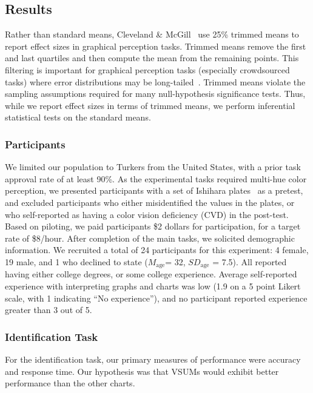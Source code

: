 \documentclass{vgtc}                          %
\begin{document}
\subsection{Results}

Rather than standard means, Cleveland \& McGill~\cite{cleveland1984graphical} use 25\% trimmed means to report effect sizes in graphical perception tasks. Trimmed means remove the first and last quartiles and then compute the mean from the remaining points. This filtering is important for graphical perception tasks (especially crowdsourced tasks) where error distributions may be long-tailed~\cite{heer2010crowdsourcing}. Trimmed means violate the sampling assumptions required for many null-hypothesis significance tests. Thus, while we report effect sizes in terms of trimmed means, we perform inferential statistical tests on the standard means.

\subsubsection{Participants}

We limited our population to Turkers from the United States, with a prior task approval rate of at least 90\%. As the experimental tasks required multi-hue color perception, we presented participants with a set of Ishihara plates~\cite{hardy1945tests} as a pretest, and excluded participants who either misidentified the values in the plates, or who self-reported as having a color vision deficiency (CVD) in the post-test. Based on piloting, we paid participants \$2 dollars for participation, for a target rate of \$8/hour. After completion of the main tasks, we solicited demographic information. We recruited a total of 24 participants for this experiment: 4 female, 19 male, and 1 who declined to state ($M_{\text{age}}$= 32, $SD_{\text{age}}$ = 7.5). All reported having either college degrees, or some college experience. Average self-reported experience with interpreting graphs and charts was low (1.9 on a 5 point Likert scale, with 1 indicating ``No experience''), and no participant reported experience greater than 3 out of 5.

\subsubsection{Identification Task}
\accuracyFig
\responseTimeFig

For the identification task, our primary measures of performance were accuracy and response time. Our hypothesis was that VSUMs would exhibit better performance than the other charts.
\end{document}

